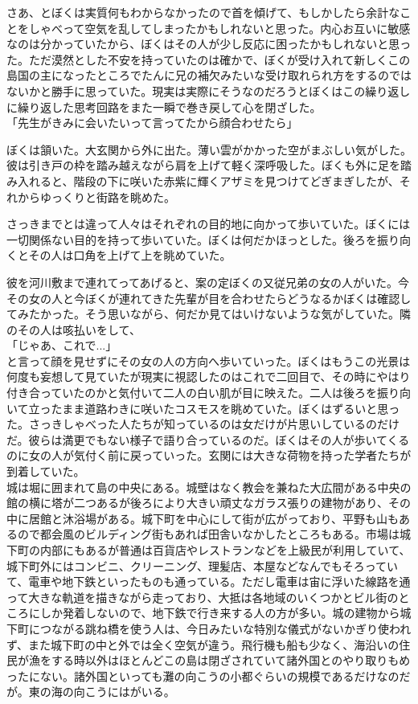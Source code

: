 \documentclass[b5j,twoside,twocolumn]{utarticle}
\begin{document}
さあ、とぼくは実質何もわからなかったので首を傾げて、もしかしたら余計なことをしゃべって空気を乱してしまったかもしれないと思った。内心お互いに敏感なのは分かっていたから、ぼくはその人が少し反応に困ったかもしれないと思った。ただ漠然とした不安を持っていたのは確かで、ぼくが受け入れて新しくこの島国の主になったところでたんに兄の補欠みたいな受け取れられ方をするのではないかと勝手に思っていた。現実は実際にそうなのだろうとぼくはこの繰り返しに繰り返した思考回路をまた一瞬で巻き戻して心を閉ざした。\\
「先生がきみに会いたいって言ってたから顔合わせたら」


ぼくは頷いた。大玄関から外に出た。薄い雲がかかった空がまぶしい気がした。彼は引き戸の枠を踏み越えながら肩を上げて軽く深呼吸した。ぼくも外に足を踏み入れると、階段の下に咲いた赤紫に輝くアザミを見つけてどぎまぎしたが、それからゆっくりと街路を眺めた。


さっきまでとは違って人々はそれぞれの目的地に向かって歩いていた。ぼくには一切関係ない目的を持って歩いていた。ぼくは何だかほっとした。後ろを振り向くとその人は口角を上げて上を眺めていた。


彼を河川敷まで連れてってあげると、案の定ぼくの又従兄弟の女の人がいた。今その女の人と今ぼくが連れてきた先輩が目を合わせたらどうなるかぼくは確認してみたかった。そう思いながら、何だか見てはいけないような気がしていた。隣のその人は咳払いをして、\\
「じゃあ、これで...」\\
と言って顔を見せずにその女の人の方向へ歩いていった。ぼくはもうこの光景は何度も妄想して見ていたが現実に視認したのはこれで二回目で、その時にやはり付き合っていたのかと気付いて二人の白い肌が目に映えた。二人は後ろを振り向いて立ったまま道路わきに咲いたコスモスを眺めていた。ぼくはずるいと思った。さっきしゃべった人たちが知っているのは女だけが片思いしているのだけだ。彼らは満更でもない様子で語り合っているのだ。ぼくはその人が歩いてくるのに女の人が気付く前に戻っていった。玄関には大きな荷物を持った学者たちが到着していた。\\



城は堀に囲まれて島の中央にある。城壁はなく教会を兼ねた大広間がある中央の館の横に塔が二つあるが後ろにより大きい頑丈なガラス張りの建物があり、その中に居館と沐浴場がある。城下町を中心にして街が広がっており、平野も山もあるので都会風のビルディング街もあれば田舎いなかしたところもある。市場は城下町の内部にもあるが普通は百貨店やレストランなどを上級民が利用していて、城下町外にはコンビニ、クリーニング、理髪店、本屋などなんでもそろっていて、電車や地下鉄といったものも通っている。ただし電車は宙に浮いた線路を通って大きな軌道を描きながら走っており、大抵は各地域のいくつかとビル街のところにしか発着しないので、地下鉄で行き来する人の方が多い。城の建物から城下町につながる跳ね橋を使う人は、今日みたいな特別な儀式がないかぎり使われず、また城下町の中と外では全く空気が違う。飛行機も船も少なく、海沿いの住民が漁をする時以外はほとんどこの島は閉ざされていて諸外国とのやり取りもめったにない。諸外国といっても灘の向こうの小都ぐらいの規模であるだけなのだが。東の海の向こうにはがいる。\\
\end{document}
